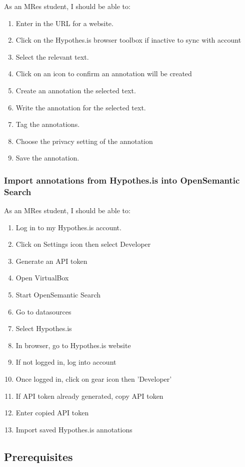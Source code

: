 \documentclass{article}
\begin{document}
As an MRes student, I should be able to:
\begin{enumerate}
\item Enter in the URL for a website. 
\item Click on the Hypothes.is browser toolbox if inactive to sync with account
\item Select the relevant text. 
\item Click on an icon to confirm an annotation will be created
\item Create an annotation the selected text.
\item Write the annotation for the selected text.
\item Tag the annotations. 
\item Choose the privacy setting of the annotation
\item Save the annotation. 
\end{enumerate}

\subsubsection*{Import annotations from Hypothes.is into OpenSemantic Search}

As an MRes student, I should be able to:
\begin{enumerate}
\item Log in to my Hypothes.is account.
\item Click on Settings icon then select Developer
\item Generate an API token
\item Open VirtualBox
\item Start OpenSemantic Search
\item Go to datasources
\item Select Hypothes.is
\item In browser, go to Hypothes.is website
\item If not logged in, log into account
\item Once logged in, click on gear icon then 'Developer'
\item If API token already generated, copy API token
\item Enter copied API token
\item Import saved Hypothes.is annotations
\end{enumerate}

\subsection*{Prerequisites}
\end{document}
